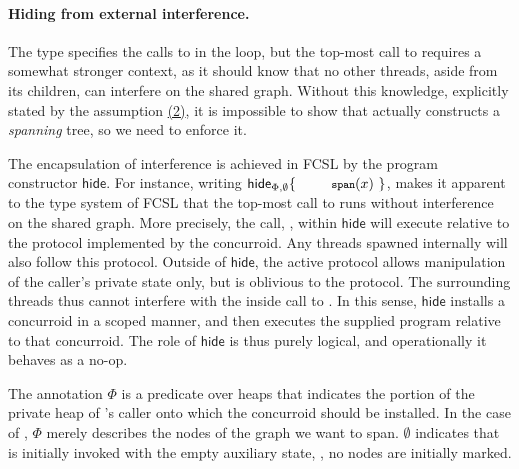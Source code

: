 
\paragraph{Hiding from external interference.~~}
\label{sec:restr-extern-interf}
%
The type  specifies the calls to  in the
loop, but the top-most call to  requires a somewhat
stronger context, as it should know that no other threads, aside from
its children, can interfere on the shared graph. Without this
knowledge, explicitly stated by the assumption \hyperlink{asm2}{(2)},
it is impossible to show that  actually constructs a
\emph{spanning} tree, so we need to enforce it.

The encapsulation of interference is achieved in FCSL by the program
constructor $\mathsf{hide}$. For instance, writing
%
$\mathsf{hide}_{\Phi, \emptyset}\{~\esc{span}(x)~\}$,
%
makes it apparent to the type system of FCSL that the top-most call to
 runs without interference on the shared graph.  More
precisely, the call, , within $\mathsf{hide}$ will
execute relative to the protocol implemented by the 
concurroid. Any threads spawned internally will also follow this
protocol.  Outside of $\mathsf{hide}$, the active protocol allows
manipulation of the caller's private state only, but is oblivious to
the  protocol. The surrounding threads thus cannot
interfere with the inside call to . In this sense,
$\mathsf{hide}$ installs a concurroid in a scoped manner, and then
executes the supplied program relative to that concurroid. The role of
$\mathsf{hide}$ is thus purely logical, and operationally it behaves
as a no-op.

The annotation $\Phi$ is a predicate over heaps that indicates the
portion of the private heap of 's caller onto which the
 concurroid should be installed. In the case of
, $\Phi$ merely describes the nodes of the graph we want to
span. $\emptyset$ indicates that  is initially invoked with
the empty auxiliary state, \ie, no nodes are initially marked.

